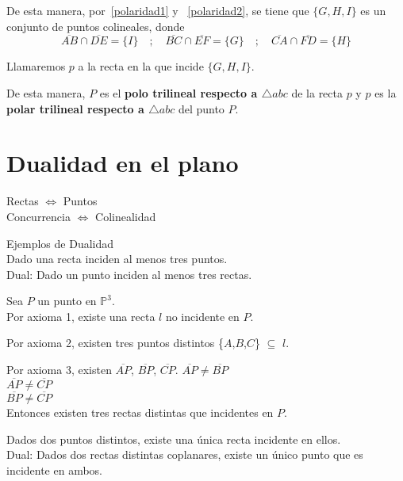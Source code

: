 \documentclass[12pt]{book}
\theoremstyle{definition}
\begin{document}
De esta manera, por~\ref{polaridad1} y ~\ref{polaridad2}, se tiene que $\{G,H, I\}$ es un conjunto de puntos colineales, donde
$$\overline{AB} \cap \overline{DE} = \{I\} \quad; \quad \overline{BC} \cap \overline{EF} = \{G\} \quad ; \quad \overline{CA} \cap \overline{FD} = \{H\}$$

Llamaremos $p$ a la recta en la que incide $\{G,H,I\}$.

De esta manera, $P$ es el \textbf{polo trilineal respecto a $\triangle abc$} de la recta $p$ y $p$ es la \textbf{polar trilineal respecto a $\triangle abc$} del punto $P$.

\chapter{Dualidad en el plano}

Rectas $\Leftrightarrow$ Puntos\\
Concurrencia $\Leftrightarrow$ Colinealidad

  Ejemplos de Dualidad\\
  Dado una recta inciden al menos tres puntos.\\
  Dual: Dado un punto inciden al menos tres rectas.
  
    Sea $P$ un punto en $\mathbb{P}^3$.\\
    Por axioma 1, existe una recta $l$ no incidente en $P$.

    Por axioma 2, existen tres puntos distintos \{$A$,$B$,$C$\} $\subseteq$ $l$.

    Por axioma 3, existen $\overline{AP}$, $\overline{BP}$, $\overline{CP}$.
    $\overline{AP} \neq \overline{BP}$\\
    $\overline{AP} \neq \overline{CP}$\\
    $\overline{BP} \neq \overline{CP}$\\

    Entonces existen tres rectas distintas que incidentes en $P$.

  Dados dos puntos distintos, existe una única recta incidente en ellos.\\
  Dual: Dados dos rectas distintas coplanares, existe un único punto que es
  incidente en ambos.\\
\end{document}
